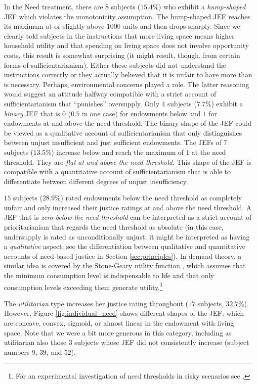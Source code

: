 \documentclass[12pt]{scrartcl}
\begin{document}
In the Need treatment, there are $8$ subjects ($15.4\%$) who exhibit a \textit{hump-shaped} JEF which violates the monotonicity assumption.
The hump-shaped JEF reaches its maximum at or slightly above $1000$ units and then drops sharply.
Since we clearly told subjects in the instructions that more living space means higher household utility and that spending on living space does not involve opportunity costs, this result is somewhat surprising (it might result, though, from certain forms of sufficientarianism).
Either these subjects did not understand the instructions correctly or they actually believed that it is unfair to have more than is necessary.
Perhaps, environmental concerns played a role.
The latter reasoning would suggest an attitude halfway compatible with a strict account of sufficientarianism that ``punishes'' oversupply.
Only $4$ subjects ($7.7\%$) exhibit a \textit{binary} JEF that is $0$ ($0.5$ in one case) for endowments below and $1$ for endowments at and above the need threshold.
The binary shape of the JEF could be viewed as a qualitative account of sufficientarianism that only distinguishes between unjust insufficient and just sufficient endowments.
The JEFs of $7$ subjects ($13.5\%$) increase below and reach the maximum of $1$ at the need threshold.
They are \textit{flat at and above the need threshold}.
This shape of the JEF is compatible with a quantitative account of sufficientarianism that is able to differentiate between different degrees of unjust insufficiency.

$15$ subjects ($28.9\%$) rated endowments below the need threshold as completely unfair and only increased their justice ratings at and above the need threshold.
A JEF that is \textit{zero below the need threshold} can be interpreted as a strict account of prioritarianism that regards the need threshold as absolute (in this case, undersupply is rated as unconditionally unjust; it might be interpreted as having a \textit{qualitative} aspect; see the differentiation between qualitative and quantitative accounts of need-based justice in Section \ref{sec:principles}).
In demand theory, a similar idea is covered by the Stone-Geary utility function \citep{geary_note_1950,stone_linear_1954}, which assumes that the minimum consumption level is indispensable to life and that only consumption levels exceeding them generate utility.\footnote{For an experimental investigation of need thresholds in risky scenarios see \citet{diederich_need_2020}.}

The \textit{utilitarian} type increases her justice rating throughout ($17$ subjects, $32.7\%$).
However, Figure \ref{fig:individual_need} shows different shapes of the JEF, which are concave, convex, sigmoid, or almost linear in the endowment with living space.
Note that we were a bit more generous in this category, including as utilitarian also those $3$ subjects whose JEF did not consistently increase (subject numbers $9$, $39$, and $52$).
\end{document}
